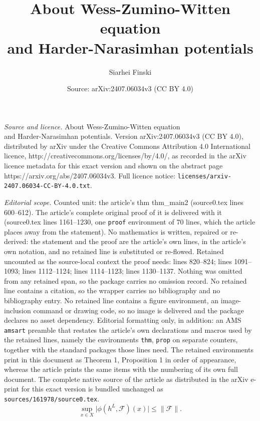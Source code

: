 \documentclass[10pt,a4paper]{amsart}
\title{\vspace*{-1.5cm} About Wess-Zumino-Witten equation \\ and Harder-Narasimhan potentials}
\author{Siarhei Finski}
\date{Source: arXiv:2407.06034v3 (CC BY 4.0)}
\begin{document}
\maketitle

\noindent\emph{Source and licence.} \vspace*{-1.5cm} About Wess-Zumino-Witten equation \\ and Harder-Narasimhan potentials. Version arXiv:2407.06034v3 (CC BY 4.0), distributed by arXiv under the Creative Commons Attribution 4.0 International licence, http://creativecommons.org/licenses/by/4.0/, as recorded in the arXiv licence metadata for this exact version and shown on the abstract page https://arxiv.org/abs/2407.06034v3. Full licence notice: \texttt{licenses/arxiv-2407.06034-CC-BY-4.0.txt}.\par\smallskip

\noindent\textit{Editorial scope.} Counted unit: the article's thm thm\_main2 (source0.tex lines 600--612). The article's complete original proof of it is delivered with it (source0.tex lines 1161--1230, one \texttt{proof} environment of 70 lines, which the article places away from the statement). No mathematics is written, repaired or re-derived: the statement and the proof are the article's own lines, in the article's own notation, and no retained line is substituted or re-flowed.  Retained uncounted as the source-local context the proof needs: lines 820--824; lines 1091--1093; lines 1112--1124; lines 1114--1123; lines 1130--1137.  Nothing was omitted from any retained span, so the package carries no omission record.  No retained line contains a citation, so the wrapper carries no bibliography and no bibliography entry.  No retained line contains a figure environment, an image-inclusion command or drawing code, so no image is delivered and the package declares no asset dependency.  Editorial formatting only, in addition: an AMS \texttt{amsart} preamble that restates the article's own declarations and macros used by the retained lines, namely the environments \texttt{thm}, \texttt{prop} on separate counters, together with the standard packages those lines need.  The retained environments print in this document as Theorem 1, Proposition 1 in order of appearance, whereas the article prints the same items with the numbering of its own full document.  The complete native source of the article as distributed in the arXiv e-print for this exact version is bundled unchanged as \texttt{sources/161978/source0.tex}.
	\begin{equation}\label{eq_geod_ray_bnd}
		\sup_{x \in X} \big| \phi(h^L, \mathcal{F})(x) \big|
		\leq
		\| \mathcal{F} \|.
	\end{equation}
\end{document}
